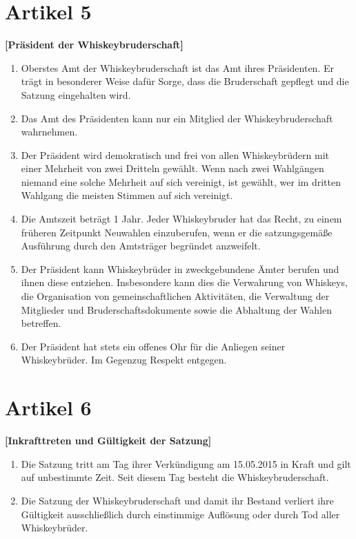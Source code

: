 \documentclass[a4paper,12pt]{scrartcl}
\begin{document}
\section{Artikel 5}
\label{sec:präsident}
\textbf{[Präsident der Whiskeybruderschaft]}

\begin{enumerate}

\item Oberstes Amt der Whiskeybruderschaft ist das Amt ihres Präsidenten. Er trägt in besonderer
  Weise dafür Sorge, dass die Bruderschaft gepflegt und die Satzung eingehalten wird.

\item Das Amt des Präsidenten kann nur ein Mitglied der Whiskeybruderschaft wahrnehmen.

\item Der Präsident wird demokratisch und frei von allen Whiskeybrüdern mit einer Mehrheit von zwei
  Dritteln gewählt. Wenn nach zwei Wahlgängen niemand eine solche Mehrheit auf sich vereinigt, ist
  gewählt, wer im dritten Wahlgang die meisten Stimmen auf sich vereinigt.

\item Die Amtszeit beträgt 1 Jahr. Jeder Whiskeybruder hat das Recht, zu einem früheren Zeitpunkt
  Neuwahlen einzuberufen, wenn er die satzungsgemäße Ausführung durch den Amtsträger begründet
  anzweifelt.

\item Der Präsident kann Whiskeybrüder in zweckgebundene Ämter berufen und ihnen diese entziehen.
  Insbesondere kann dies die Verwahrung von Whiskeys, die Organisation von gemeinschaftlichen
  Aktivitäten, die Verwaltung der Mitglieder und Bruderschaftsdokumente sowie die Abhaltung der
  Wahlen betreffen.

\item Der Präsident hat stets ein offenes Ohr für die Anliegen seiner Whiskeybrüder. Im Gegenzug
  Respekt entgegen.

\end{enumerate}



\section{Artikel 6}
\label{sec:gültigkeit}
\textbf{[Inkrafttreten und Gültigkeit der Satzung]}

\begin{enumerate}

\item Die Satzung tritt am Tag ihrer Verkündigung am 15.05.2015 in Kraft und gilt auf unbestimmte
  Zeit. Seit diesem Tag besteht die Whiskeybruderschaft.

\item Die Satzung der Whiskeybruderschaft und damit ihr Bestand verliert ihre Gültigkeit
  ausschließlich durch einstimmige Auflösung oder durch Tod aller Whiskeybrüder.

\end{enumerate}
\end{document}
